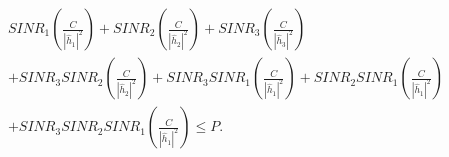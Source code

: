 \documentclass[preview]{standalone}
\begin{document}
\begin{align*}
SINR_1 \left( \frac{C}{\left|{\hat{h}_1}\right|^2} \right) + SINR_2 \left( \frac{C}{\left|{\hat{h}_2}\right|^2} \right) + SINR_3 \left( \frac{C}{\left|{\hat{h}_3}\right|^2} \right) \\ + SINR_3 SINR_2 \left( \frac{C}{\left|{\hat{h}_2}\right|^2} \right) + SINR_3 SINR_1 \left( \frac{C}{\left|{\hat{h}_1}\right|^2} \right) + SINR_2 SINR_1 \left( \frac{C}{\left|{\hat{h}_1}\right|^2} \right) \\ + SINR_3 SINR_2 SINR_1 \left( \frac{C}{\left|{\hat{h}_1}\right|^2} \right) \leq P.
\end{align*}
\end{document}
